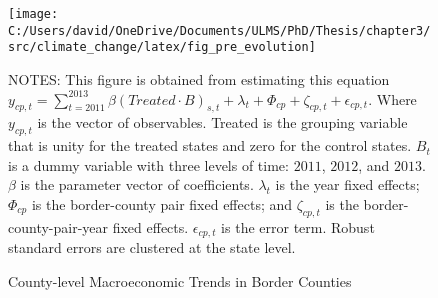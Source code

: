 \begin{figure}[H]
    \centering
    \texttt{[image: C:/Users/david/OneDrive/Documents/ULMS/PhD/Thesis/chapter3/src/climate\_change/latex/fig\_pre\_evolution]}
    \caption{County-level Macroeconomic Trends in Border Counties}
    \label{fig:county-level-macroeconomic-trends-in-border-counties}
    \begin{minipage}{14cm}
        \vspace{0.05in}
        \tiny NOTES: This figure is obtained from estimating this equation $y_{cp,t} = \sum_{t = 2011}^{2013} \beta (Treated \cdot B)_{s,t} + \lambda_{t} + \Phi_{cp} + \zeta_{cp,t} + \epsilon_{cp,t}$. Where $y_{cp,t}$ is the vector of observables. Treated is the grouping variable that is unity for the treated states and zero for the control states. $B_{t}$ is a dummy variable with three levels of time: $2011$, $2012$, and $2013$. $\beta$ is the parameter vector of coefficients. $\lambda_{t}$ is the year fixed effects; $\Phi_{cp}$ is the border-county pair fixed effects; and $\zeta_{cp,t}$ is the border-county-pair-year fixed effects. $\epsilon_{cp,t}$ is the error term. Robust standard errors are clustered at the state level.
    \end{minipage}
\end{figure}